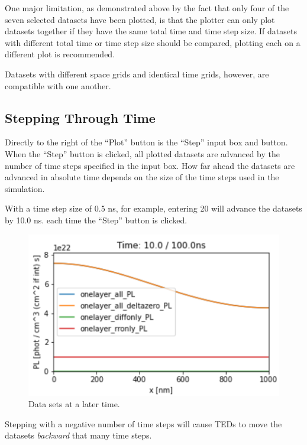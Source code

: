 \documentclass[11pt,letterpaper,titlepage]{article}
\begin{document}
		\par One major limitation, as demonstrated above by the fact that only four of the seven selected datasets have been plotted, is that the plotter can only plot datasets together if they have the same total time and time step size. If datasets with different total time or time step size should be compared, plotting each on a different plot is recommended.
		
		\par Datasets with different space grids and identical time grids, however, are compatible with one another.
		
		\subsection{Stepping Through Time}
		\par Directly to the right of the “Plot” button is the “Step” input box and button. When the “Step” button is clicked, all plotted datasets are advanced by the number of time steps specified in the input box. How far ahead the datasets are advanced in absolute time depends on the size of the time steps used in the simulation.
		
		\par With a time step size of 0.5 ns, for example, entering 20 will advance the datasets by 10.0 ns. each time the “Step” button is clicked.
		
		\begin{figure}[H]
			\label{fig:step_forward_example}
			\centering
			\includegraphics[scale=1.0]{"step_forward_example"}
			\caption{Data sets at a later time.}
		\end{figure}
	
		\par Stepping with a negative number of time steps will cause TEDs to move the datasets \textit{backward} that many time steps.
		
\end{document}
